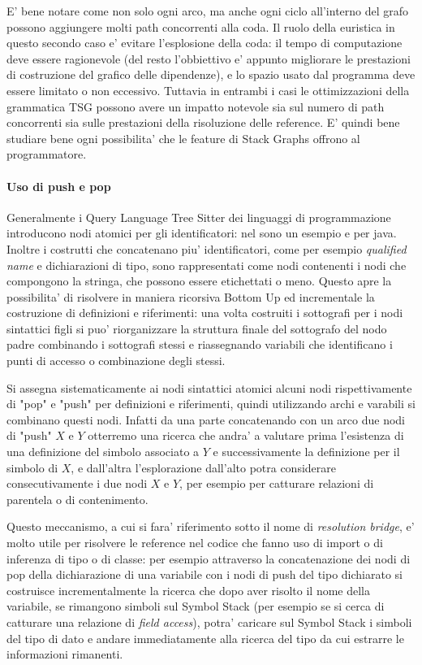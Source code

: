 \par
E' bene notare come non solo ogni arco, ma anche ogni ciclo all'interno del grafo possono aggiungere molti path concorrenti alla coda.
Il ruolo della euristica in questo secondo caso e' evitare l'esplosione della coda: il tempo di computazione deve essere ragionevole (del resto l'obbiettivo e' appunto migliorare le prestazioni di costruzione del grafico delle dipendenze), e lo spazio usato dal programma deve essere limitato o non eccessivo.
Tuttavia in entrambi i casi le ottimizzazioni della grammatica TSG possono avere un impatto notevole sia sul numero di path concorrenti sia sulle prestazioni della risoluzione delle reference. E' quindi bene studiare bene ogni possibilita' che le feature di Stack Graphs offrono al programmatore.

\paragraph{Uso di push e pop}

Generalmente i Query Language Tree Sitter dei linguaggi di programmazione introducono nodi atomici per gli identificatori: nel sono un esempio \emph{} e \emph{} per java.
Inoltre i costrutti che concatenano piu' identificatori, come per esempio \emph{qualified name} e dichiarazioni di tipo, sono rappresentati come nodi contenenti i nodi che compongono la stringa, che possono essere etichettati o meno.
Questo apre la possibilita' di risolvere in maniera ricorsiva Bottom Up ed incrementale la costruzione di definizioni e riferimenti: una volta costruiti i sottografi per i nodi sintattici figli si puo' riorganizzare la struttura finale del sottografo del nodo padre combinando i sottografi stessi e riassegnando variabili che identificano i punti di accesso o combinazione degli stessi.

\par
Si assegna sistematicamente ai nodi sintattici atomici alcuni nodi rispettivamente di "pop" e "push" per definizioni e riferimenti, quindi utilizzando archi e varabili si combinano questi nodi.
Infatti da una parte concatenando con un arco due nodi di "push" $X$ e $Y$ otterremo una ricerca che andra' a valutare prima l'esistenza di una definizione del simbolo associato a $Y$ e successivamente la definizione per il simbolo di $X$, e dall'altra l'esplorazione dall'alto potra considerare consecutivamente i due nodi $X$ e $Y$, per esempio per catturare relazioni di parentela o di contenimento.

\par
Questo meccanismo, a cui si fara' riferimento sotto il nome di \emph{resolution bridge}, e' molto utile per risolvere le reference nel codice che fanno uso di import o di inferenza di tipo o di classe: per esempio attraverso la concatenazione dei nodi di pop della dichiarazione di una variabile con i nodi di push del tipo dichiarato si costruisce incrementalmente la ricerca che dopo aver risolto il nome della variabile, se rimangono simboli sul Symbol Stack (per esempio se si cerca di catturare una relazione di \emph{field access}), potra' caricare sul Symbol Stack i simboli del tipo di dato e andare immediatamente alla ricerca del tipo da cui estrarre le informazioni rimanenti.

